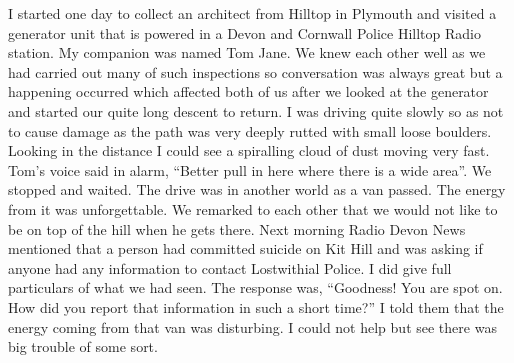 I started one day to collect an architect from Hilltop in Plymouth and visited a
generator unit that is powered in a Devon and Cornwall Police Hilltop Radio
station. My companion was named Tom Jane.   We knew each other well as we had
carried out many of such inspections so conversation was always great but a
happening occurred which affected both of us after we looked at the generator
and started our quite long descent to return. I was driving quite slowly so as
not to cause damage as the path was very deeply rutted with small loose
boulders. Looking in the distance I could see a spiralling cloud of dust moving
very fast. Tom's voice said in alarm, ``Better pull in here where there is a
wide area''. We stopped and waited. The drive was in another world as a van
passed. The energy from it was unforgettable. We remarked to each other that we
would not like to be on top of the hill when he gets there. Next morning Radio
Devon News mentioned that a person had committed suicide on Kit Hill and was
asking if anyone had any information to contact Lostwithial Police. I did give
full particulars of what we had seen. The response was, ``Goodness! You are
spot on. How did you report that information in such a short time?'' I told
them that the energy coming from that van was disturbing. I could not help but
see there was big trouble of some sort.

